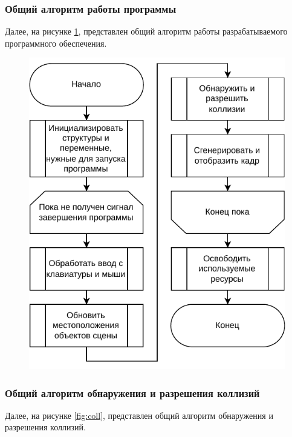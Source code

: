 \newpage

\subsubsection{Общий алгоритм работы программы}

Далее, на рисунке \ref{fig:common}, представлен общий алгоритм работы разрабатываемого программного обеспечения.

\begin{figure}[H]
	\centering
	\includegraphics[scale=1]{diag/common-algo.pdf}
	\caption{}
	\label{fig:common}
\end{figure}

\newpage

\subsubsection{Общий алгоритм обнаружения и разрешения коллизий}

Далее, на рисунке \ref{fig:coll}, представлен общий алгоритм обнаружения и разрешения коллизий.

